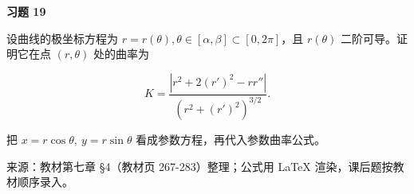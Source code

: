 \begin{exercisebox}
\textbf{习题 19 }

设曲线的极坐标方程为 \(r=r(\theta),\theta\in[\alpha,\beta]\subset[0,2\pi]\)，且 \(r(\theta)\) 二阶可导。证明它在点 \((r,\theta)\) 处的曲率为

\[
      K=\frac{|r^2+2(r')^2-rr''|}{(r^2+(r')^2)^{3/2}}.
      \]

\begin{hintbox}
把 \(x=r\cos\theta,\ y=r\sin\theta\) 看成参数方程，再代入参数曲率公式。
\end{hintbox}
\end{exercisebox}

来源：教材第七章 §4（教材页 267-283）整理；公式用 LaTeX 渲染，课后题按教材顺序录入。
